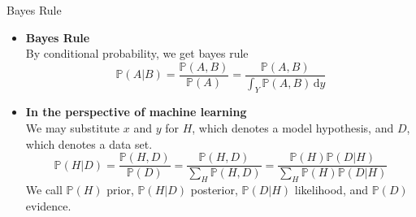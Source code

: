 \documentclass{bredelebeamer}
\begin{document}
\begin{frame}{Bayes Rule}
  \begin{itemize}
    \item\begin{justify}
      \textbf{Bayes Rule}\\
      By conditional probability, we get bayes rule
      \begin{equation}
        \mathbb{P}(A|B) = \frac{\mathbb{P}(A, B)}{\mathbb{P}(A)}
        = \frac{\mathbb{P}(A, B)}{\int_{Y} \mathbb{P}(A,B)\, \mathrm{d}y}
      \end{equation}
    \end{justify}
    \item\begin{justify}
      \textbf{In the perspective of machine learning}\\
      We may substitute $x$ and $y$ for $H$, which denotes a model hypothesis,
      and $D$, which denotes a data set.
      \begin{equation}
        \mathbb{P}(H|D)
          = \frac{\mathbb{P}(H,D)}{\mathbb{P}(D)}
          = \frac{\mathbb{P}(H,D)}{\sum_H \mathbb{P}(H,D)}
          = \frac{\mathbb{P}(H)\mathbb{P}(D|H)}{\sum_H \mathbb{P}(H)\mathbb{P}(D|H)}
      \end{equation}
      We call $\mathbb{P}(H)$ prior, $\mathbb{P}(H|D)$ posterior,
      $\mathbb{P}(D|H)$ likelihood, and $\mathbb{P}(D)$ evidence.
    \end{justify}

  \end{itemize}
\end{frame}


\end{document}
